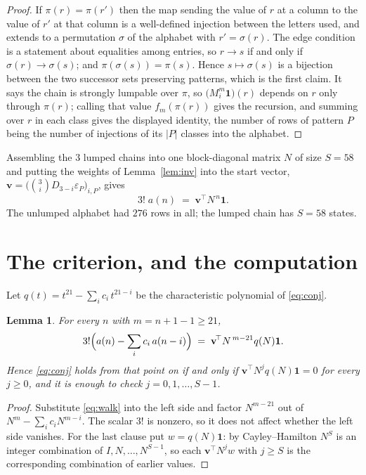 \documentclass[11pt,a4paper]{article}
\theoremstyle{plain}
\newtheorem{lemma}[theorem]{Lemma}
\theoremstyle{definition}
\begin{document}
\begin{proof}
If $\pi(r)=\pi(r')$ then the map sending the value of $r$ at a column to the value of $r'$
at that column is a well-defined injection between the letters used, and extends to a
permutation $\sigma$ of the alphabet with $r'=\sigma(r)$. The edge condition is a statement
about equalities among entries, so $r\to s$ if and only if $\sigma(r)\to\sigma(s)$; and
$\pi(\sigma(s))=\pi(s)$. Hence $s\mapsto\sigma(s)$ is a bijection between the two successor
sets preserving patterns, which is the first claim. It says the chain is strongly lumpable
over $\pi$, so $\bigl(M_i^{m}\mathbf{1}\bigr)(r)$ depends on $r$ only through $\pi(r)$;
calling that value $f_m(\pi(r))$ gives the recursion, and summing over $r$ in each class
gives the displayed identity, the number of rows of pattern $P$ being the number of
injections of its $|P|$ classes into the alphabet.
\end{proof}

Assembling the $3$ lumped chains into one block-diagonal matrix $N$ of size $S=58$ and
putting the weights of Lemma~\ref{lem:inv} into the start vector,
$\mathbf{v}=\bigl(\binom{3}{i}D_{3-i}\varepsilon_P\bigr)_{i,P}$, gives
\begin{equation}\label{eq:walk}
3!\;a(n)\;=\;\mathbf{v}^{\!\top}N^{\,n}\mathbf{1} .
\end{equation}
The unlumped alphabet had $276$ rows in all; the lumped chain has $S=58$ states.

\section{The criterion, and the computation}

Let $q(t)=t^{21}-\sum_i c_i\,t^{21-i}$ be the characteristic polynomial of
\eqref{eq:conj}.

\begin{lemma}\label{lem:crit}
For every $n$ with $m=n+1-1\ge21$,
\[
3!\Bigl(a(n)-\sum_i c_i\,a(n-i)\Bigr)\;=\;\mathbf{v}^{\!\top}N^{\,m-21}q(N)\mathbf{1} .
\]
Hence \eqref{eq:conj} holds from that point on if and only if
$\mathbf{v}^{\!\top}N^{j}q(N)\mathbf{1}=0$ for every $j\ge0$, and it is enough to check
$j=0,1,\dots,S-1$.
\end{lemma}

\begin{proof}
Substitute \eqref{eq:walk} into the left side and factor $N^{m-21}$ out of
$N^{m}-\sum_i c_iN^{m-i}$. The scalar $3!$ is nonzero, so it does not affect whether
the left side vanishes. For the last clause put $w=q(N)\mathbf{1}$: by Cayley--Hamilton
$N^{S}$ is an integer combination of $I,N,\dots,N^{S-1}$, so each
$\mathbf{v}^{\!\top}N^{j}w$ with $j\ge S$ is the corresponding combination of earlier
values.
\end{proof}
\end{document}
